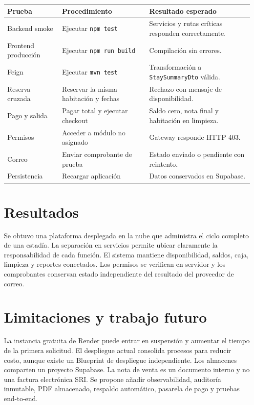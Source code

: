 \documentclass[12pt,a4paper]{article}
\begin{document}
\begin{longtable}{p{4cm}p{5cm}p{5cm}}
\toprule
Prueba & Procedimiento & Resultado esperado \\
\midrule
Backend smoke & Ejecutar \texttt{npm test} & Servicios y rutas críticas responden correctamente. \\
Frontend producción & Ejecutar \texttt{npm run build} & Compilación sin errores. \\
Feign & Ejecutar \texttt{mvn test} & Transformación a \texttt{StaySummaryDto} válida. \\
Reserva cruzada & Reservar la misma habitación y fechas & Rechazo con mensaje de disponibilidad. \\
Pago y salida & Pagar total y ejecutar checkout & Saldo cero, nota final y habitación en limpieza. \\
Permisos & Acceder a módulo no asignado & Gateway responde HTTP 403. \\
Correo & Enviar comprobante de prueba & Estado enviado o pendiente con reintento. \\
Persistencia & Recargar aplicación & Datos conservados en Supabase. \\
\bottomrule
\end{longtable}

\section{Resultados}

Se obtuvo una plataforma desplegada en la nube que administra el ciclo completo de una estadía. La separación en servicios permite ubicar claramente la responsabilidad de cada función. El sistema mantiene disponibilidad, saldos, caja, limpieza y reportes conectados. Los permisos se verifican en servidor y los comprobantes conservan estado independiente del resultado del proveedor de correo.

\section{Limitaciones y trabajo futuro}

La instancia gratuita de Render puede entrar en suspensión y aumentar el tiempo de la primera solicitud. El despliegue actual consolida procesos para reducir costo, aunque existe un Blueprint de despliegue independiente. Los almacenes comparten un proyecto Supabase. La nota de venta es un documento interno y no una factura electrónica SRI. Se propone añadir observabilidad, auditoría inmutable, PDF almacenado, respaldo automático, pasarela de pago y pruebas end-to-end.
\end{document}
